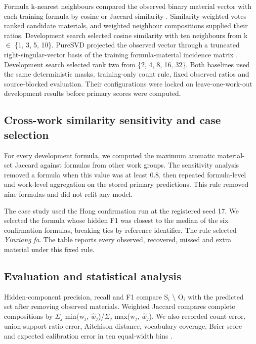 \documentclass[12pt]{article}
\begin{document}
Formula k-nearest neighbours compared the observed binary material vector with each training formula by cosine or Jaccard similarity \cite{ref16}. Similarity-weighted votes ranked candidate materials, and weighted neighbour compositions supplied their ratios. Development search selected cosine similarity with ten neighbours from k \ensuremath{\in} \{1, 3, 5, 10\}. PureSVD projected the observed vector through a truncated right-singular-vector basis of the training formula-material incidence matrix \cite{ref17}. Development search selected rank two from \{2, 4, 8, 16, 32\}. Both baselines used the same deterministic masks, training-only count rule, fixed observed ratios and source-blocked evaluation. Their configurations were locked on leave-one-work-out development results before primary scores were computed.

\subsection*{Cross-work similarity sensitivity and case selection}

For every development formula, we computed the maximum aromatic material-set Jaccard against formulas from other work groups. The sensitivity analysis removed a formula when this value was at least 0.8, then repeated formula-level and work-level aggregation on the stored primary predictions. This rule removed nine formulas and did not refit any model.

The case study used the Hong confirmation run at the registered seed 17. We selected the formula whose hidden F1 was closest to the median of the six confirmation formulas, breaking ties by reference identifier. The rule selected \emph{Yinxiang fa}. The table reports every observed, recovered, missed and extra material under this fixed rule.

\subsection*{Evaluation and statistical analysis}

Hidden-component precision, recall and F1 compare S\ensuremath{_{i}} \textbackslash{} O\ensuremath{_{i}} with the predicted set after removing observed materials. Weighted Jaccard compares complete compositions by \ensuremath{\Sigma}\ensuremath{_{j}} min(w\ensuremath{_{j}}, \ensuremath{\hat{w}}\ensuremath{_{j}})/\ensuremath{\Sigma}\ensuremath{_{j}} max(w\ensuremath{_{j}}, \ensuremath{\hat{w}}\ensuremath{_{j}}). We also recorded count error, union-support ratio error, Aitchison distance, vocabulary coverage, Brier score and expected calibration error in ten equal-width bins \cite{ref15}.
\end{document}
